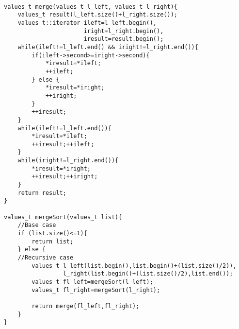 \begin{lstlisting}

values_t merge(values_t l_left, values_t l_right){
	values_t result(l_left.size()+l_right.size());
	values_t::iterator ileft=l_left.begin(),
					   iright=l_right.begin(),
					   iresult=result.begin();
	while(ileft!=l_left.end() && iright!=l_right.end()){
		if(ileft->second>=iright->second){
			*iresult=*ileft;
			++ileft;
		} else {
			*iresult=*iright;
			++iright;
		}
		++iresult;
	}
	while(ileft!=l_left.end()){
		*iresult=*ileft;
		++iresult;++ileft;
	}
	while(iright!=l_right.end()){
		*iresult=*iright;
		++iresult;++iright;
	}
	return result;
}

values_t mergeSort(values_t list){
	//Base case
	if (list.size()<=1){
		return list;
	} else {
	//Recursive case
		values_t l_left(list.begin(),list.begin()+(list.size()/2)),
				 l_right(list.begin()+(list.size()/2),list.end());
		values_t fl_left=mergeSort(l_left);
		values_t fl_right=mergeSort(l_right);

		return merge(fl_left,fl_right);
	}
}
\end{lstlisting}
